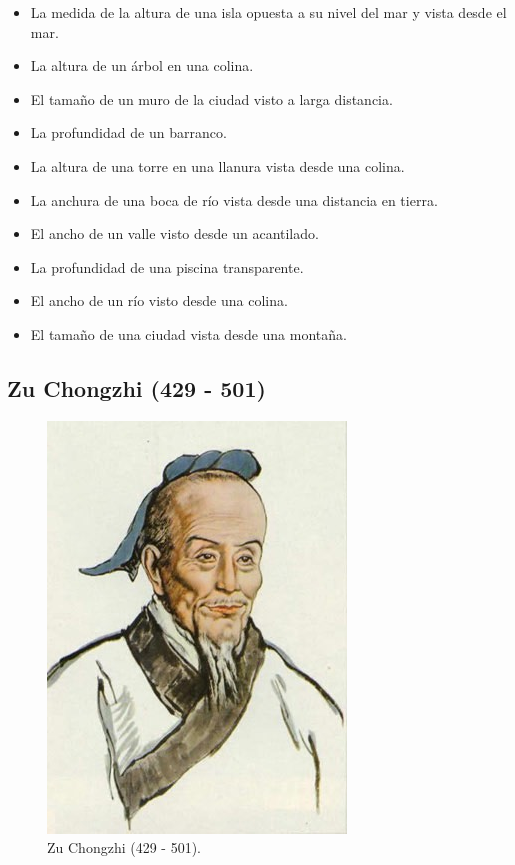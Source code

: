 \documentclass[a4paper, 11pt]{article}
\begin{document}
		\begin{itemize}
			\item La medida de la altura de una isla opuesta a su nivel del mar y vista desde el mar.
			\item La altura de un árbol en una colina.
			\item El tamaño de un muro de la ciudad visto a larga distancia.
			\item La profundidad de un barranco.
			\item La altura de una torre en una llanura vista desde una colina.
			\item La anchura de una boca de río vista desde una distancia en tierra.
			\item El ancho de un valle visto desde un acantilado.
			\item La profundidad de una piscina transparente.
			\item El ancho de un río visto desde una colina.
			\item El tamaño de una ciudad vista desde una montaña.
		\end{itemize}

	\subsection{Zu Chongzhi (429 - 501)}
		\begin{figure}[!ht]
			\centering
			\includegraphics[width = 7 cm]{zu_chongzhi.jpg}
			\caption{Zu Chongzhi (429 - 501).}
			\label{fig:zu_chongzhi}
		\end{figure}
\end{document}
